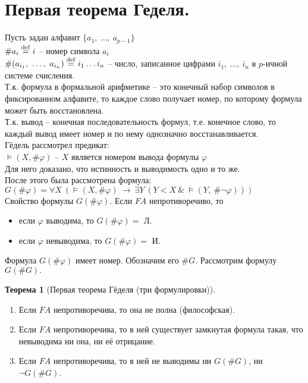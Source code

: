\documentclass[a4paper,12pt]{article}
\theoremstyle{definition} %
\newtheorem{theorem}{Теорема}[section]
\theoremstyle{definition} %
\theoremstyle{remark} %
\begin{document}
\section{Первая теорема Геделя.}
	Пусть задан алфавит $\{a_1 , \ \dots , \ a_{p - 1}\}$\\[1ex]
	$\# a_i \stackrel{\rm def}{=} i$ -- номер символа $a_i$\\[1ex]
	$\# (a_{i_1}, \ \dots , \ a_{i_n}) \stackrel{\rm def}{=} i_1 \dots i_n$ -- число, записанное цифрами $i_1, \ \dots, \ i_n$ в $p$-ичной \\[1ex]
	системе счисления. \\[4ex]
	Т.к. формула в формальной арифметике -- это конечный набор символов в фиксированном алфавите, то каждое слово получает номер, по которому формула может быть восстановлена. \\[1ex]
	Т.к. вывод -- конечная последовательность формул, т.е. конечное слово, то каждый вывод имеет номер и по нему однозначно восстанавливается. \\[4ex]
	Гёдель рассмотрел предикат: \\[1ex]
	$\vDash (X, \# \varphi)$ -- $X$ является номером вывода формулы $\varphi$ \\[1ex]
	Для него доказано, что истинность и выводимость одно и то же. \\[1ex]
	После этого была рассмотрена формула: \\[1ex]
	$G(\# \varphi) = \forall X \ (\vDash(X, \# \varphi) \ \rightarrow \ \exists Y \ (Y < X \ \& \ \vDash (Y, \ \# \neg \varphi)))$ \\[2ex]
	Свойство формулы $G(\# \varphi).$ Если $FA$ непротиворечиво, то
	\begin{itemize}
		\item если $\varphi$ выводима, то $G(\# \varphi) = $ Л.
		\item если $\varphi$ невыводима, то $G(\# \varphi) = $ И.
	\end{itemize}
	Формула $G(\# \varphi)$ имеет номер. Обозначим его $\# G$. Рассмотрим формулу $G(\# G).$
	
	\begin{theorem}[Первая теорема Гёделя (три формулировки)]
		\begin{enumerate}
			\item Если $FA$ непротиворечива, то она не полна (философская).
			\item Если $FA$ непротиворечива, то в ней существует замкнутая формула такая, что невыводима ни она, ни её отрицание.
			\item Если $FA$ непротиворечива, то в ней не выводимы ни $G(\# G)$, ни $\neg G(\# G)$.
		\end{enumerate}
	\end{theorem}
\end{document}
